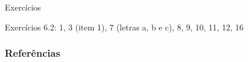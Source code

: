 \documentclass[12pt]{beamer}
\begin{document}
\begin{frame}{Exercícios}
\begin{block}{\Home}
\justifying
Exercícios 6.2: 1, 3 (item 1), 7 (letras a, b e c), 8, 9, 10, 11, 12, 16
\nocite{hogg, casella2021statistical, bolfarine}
\end{block}
\end{frame}

\begin{frame}[allowframebreaks]
\frametitle{\bf Referências}
\printbibliography
\end{frame}
\end{document}
